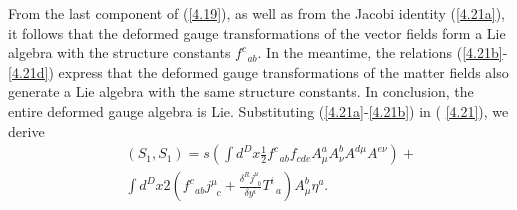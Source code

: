 \documentclass[a4paper,12pt]{article}
\begin{document}
From the last component of (\ref{4.19}),
as well as from the Jacobi identity
(\ref{4.21a}), it follows that the deformed
gauge transformations of the
vector fields form a Lie algebra with the
structure constants $f_{\;\;ab}^{c}
$. In the meantime, the relations
(\ref{4.21b}-\ref{4.21d}) express that the
deformed gauge transformations of the
matter fields also generate a Lie
algebra with the same structure constants.
In conclusion, the entire
deformed gauge algebra is Lie.
Substituting (\ref{4.21a}-\ref{4.21b}) in (%
\ref{4.21}), we derive
\begin{eqnarray}
&&\left( S_{1},S_{1}\right) =
s\left( \int d^{D}x\frac{1}{2}f_{\;%
\;ab}^{c}f_{cde}A_{\mu }^{a}A_{\nu }^{b}
A^{d\mu }A^{e\nu }\right) +
\nonumber \\
&&\int d^{D}x2\left( f_{\;\;ab}^{c}
j_{\;\;c}^{\mu }+\frac{\delta
^{R}j_{\;\;b}^{\mu }}{\delta y^{i}}
T_{\;\;a}^{i}\right) A_{\mu }^{b}\eta
^{a}.  \label{4.21e}
\end{eqnarray}
\end{document}
